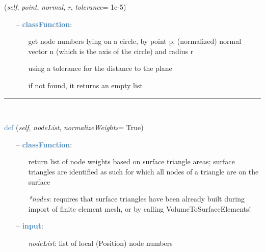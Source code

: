 \begin{itemize}[leftmargin=1.4cm]
\begin{itemize}[leftmargin=1.4cm]
\begin{itemize}[leftmargin=0.5cm]
\begin{itemize}[leftmargin=1.4cm]
\begin{itemize}[leftmargin=1.4cm]
\begin{itemize}[leftmargin=0.5cm]
\begin{flushleft}
({\it self}, {\it point}, {\it normal}, {\it r}, {\it tolerance}= 1e-5)
\end{flushleft}
\setlength{\itemindent}{0.7cm}
\begin{itemize}[leftmargin=0.7cm]
\item[--]\textcolor{steelblue}{\bf classFunction}: \vspace{-6pt}
\begin{itemize}[leftmargin=1.2cm]
\setlength{\itemindent}{-0.7cm}
\item[]get node numbers lying on a circle, by point p, (normalized) normal vector n (which is the axis of the circle) and radius r
\item[]using a tolerance for the distance to the plane
\item[]if not found, it returns an empty list
\end{itemize}
\vspace{12pt}\end{itemize}
%
\noindent\rule{8cm}{0.75pt}\vspace{1pt} \\ 
\begin{flushleft}
\noindent \textcolor{steelblue}{def {\bf {}}}\label{sec:FEM:FEMinterface:GetNodeWeightsFromSurfaceAreas}
({\it self}, {\it nodeList}, {\it normalizeWeights}= True)
\end{flushleft}
\setlength{\itemindent}{0.7cm}
\begin{itemize}[leftmargin=0.7cm]
\item[--]\textcolor{steelblue}{\bf classFunction}: \vspace{-6pt}
\begin{itemize}[leftmargin=1.2cm]
\setlength{\itemindent}{-0.7cm}
\item[]return list of node weights based on surface triangle areas; surface triangles are identified as such for which all nodes of a triangle are on the surface
\item[]{\it **nodes}: requires that surface triangles have been already built during import of finite element mesh, or by calling VolumeToSurfaceElements!
\end{itemize}
\item[--]\textcolor{steelblue}{\bf input}: \vspace{-6pt}
\begin{itemize}[leftmargin=1.2cm]
\setlength{\itemindent}{-0.7cm}
\item[]{\it nodeList}: list of local (Position) node numbers

\end{itemize}
\end{itemize}
\end{itemize}
\end{itemize}
\end{itemize}
\end{itemize}
\end{itemize}
\end{itemize}
